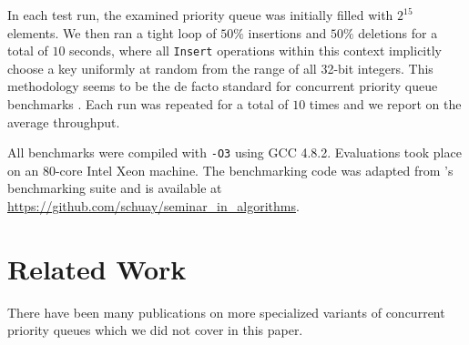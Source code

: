 \documentclass[a4paper,10pt]{article}
\begin{document}
In each test run, the examined priority queue was initially filled with $2^{15}$
elements. We then ran a tight loop of $50\%$ insertions and $50\%$ deletions
for a total of $10$ seconds, where all \lstinline|Insert|
operations within this context implicitly choose a key uniformly at random from
the range of all 32-bit integers. This methodology seems to be the de facto standard for concurrent %
priority queue benchmarks
\cite{alistarhspraylist,linden2013skiplist,shavit2000skiplist,sundell2003fast}.
Each run was repeated for a total of $10$ times
and we report on the average throughput.

All benchmarks were compiled with \verb|-O3| using GCC 4.8.2. Evaluations took place
on an 80-core Intel Xeon machine. The benchmarking code was adapted from \citeauthor{linden2013skiplist}'s
benchmarking suite and is available at \url{https://github.com/schuay/seminar_in_algorithms}.


\begin{comment}
Sections / rough structure:
* Basic concepts and definitions. Linearizability, sequ./quiescent consistency,
  lock-free, wait-free, disjoint-access parallelism (one of the papers has good
  summaries of these).
  Maybe atomic primitives such as CAS (but probably not).
* Priority queue definitions, semantics, usages. Mention inherent
  non-scalability through DeleteMin().
* Skiplist, heap definitions, semantics, usages.
* Follow development of current state of the art from Hunt Heap ~> Shavit ~>
  Tsigas ~> Linden.
* Maybe benchmarks on mars.

Additional notes:
* Sketch development: Heap, Fraser Skiplist (Details, mention why linearizable),
  Sundell/Tsigas, other Skiplist-based PQs
* Modern developments: SprayList, Wimmer et al. Relation to other relaxed structures such as k-FIFO.
\end{comment}

\section{Related Work} \label{sec:related}

There have been many publications on more specialized variants of concurrent priority queues
which we did not cover in this paper.
\end{document}
